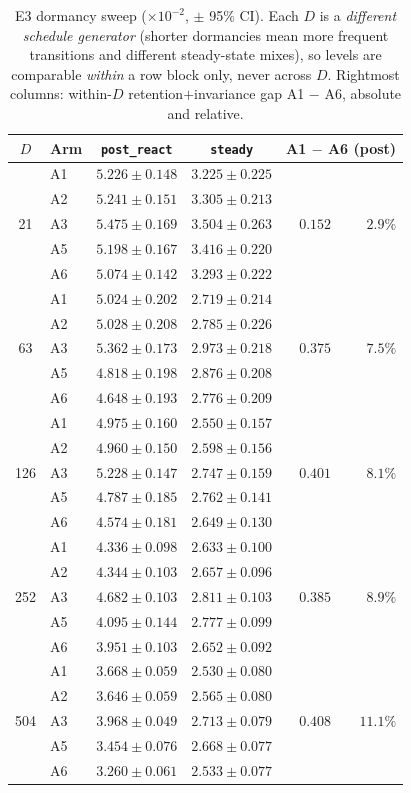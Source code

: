 \begin{table}[h]
\centering
\caption{E3 dormancy sweep ($\times 10^{-2}$, $\pm$ 95\% CI). Each $D$ is a
\emph{different schedule generator} (shorter dormancies mean more frequent
transitions and different steady-state mixes), so levels are comparable
\emph{within} a row block only, never across $D$. Rightmost columns:
within-$D$ retention$+$invariance gap A1 $-$ A6, absolute and relative.}
\label{tab:dd5-e3}
\small
\begin{tabular}{clccr@{\quad}r}
\toprule
$D$ & Arm & \texttt{post\_react} & \texttt{steady} &
\multicolumn{2}{c}{A1 $-$ A6 (post)} \\
\midrule
\multirow{5}{*}{21}
& A1 & $5.226 \pm 0.148$ & $3.225 \pm 0.225$ & & \\
& A2 & $5.241 \pm 0.151$ & $3.305 \pm 0.213$ & & \\
& A3 & $5.475 \pm 0.169$ & $3.504 \pm 0.263$ & $0.152$ & $2.9\%$ \\
& A5 & $5.198 \pm 0.167$ & $3.416 \pm 0.220$ & & \\
& A6 & $5.074 \pm 0.142$ & $3.293 \pm 0.222$ & & \\
\midrule
\multirow{5}{*}{63}
& A1 & $5.024 \pm 0.202$ & $2.719 \pm 0.214$ & & \\
& A2 & $5.028 \pm 0.208$ & $2.785 \pm 0.226$ & & \\
& A3 & $5.362 \pm 0.173$ & $2.973 \pm 0.218$ & $0.375$ & $7.5\%$ \\
& A5 & $4.818 \pm 0.198$ & $2.876 \pm 0.208$ & & \\
& A6 & $4.648 \pm 0.193$ & $2.776 \pm 0.209$ & & \\
\midrule
\multirow{5}{*}{126}
& A1 & $4.975 \pm 0.160$ & $2.550 \pm 0.157$ & & \\
& A2 & $4.960 \pm 0.150$ & $2.598 \pm 0.156$ & & \\
& A3 & $5.228 \pm 0.147$ & $2.747 \pm 0.159$ & $0.401$ & $8.1\%$ \\
& A5 & $4.787 \pm 0.185$ & $2.762 \pm 0.141$ & & \\
& A6 & $4.574 \pm 0.181$ & $2.649 \pm 0.130$ & & \\
\midrule
\multirow{5}{*}{252}
& A1 & $4.336 \pm 0.098$ & $2.633 \pm 0.100$ & & \\
& A2 & $4.344 \pm 0.103$ & $2.657 \pm 0.096$ & & \\
& A3 & $4.682 \pm 0.103$ & $2.811 \pm 0.103$ & $0.385$ & $8.9\%$ \\
& A5 & $4.095 \pm 0.144$ & $2.777 \pm 0.099$ & & \\
& A6 & $3.951 \pm 0.103$ & $2.652 \pm 0.092$ & & \\
\midrule
\multirow{5}{*}{504}
& A1 & $3.668 \pm 0.059$ & $2.530 \pm 0.080$ & & \\
& A2 & $3.646 \pm 0.059$ & $2.565 \pm 0.080$ & & \\
& A3 & $3.968 \pm 0.049$ & $2.713 \pm 0.079$ & $0.408$ & $11.1\%$ \\
& A5 & $3.454 \pm 0.076$ & $2.668 \pm 0.077$ & & \\
& A6 & $3.260 \pm 0.061$ & $2.533 \pm 0.077$ & & \\
\bottomrule
\end{tabular}
\end{table}

